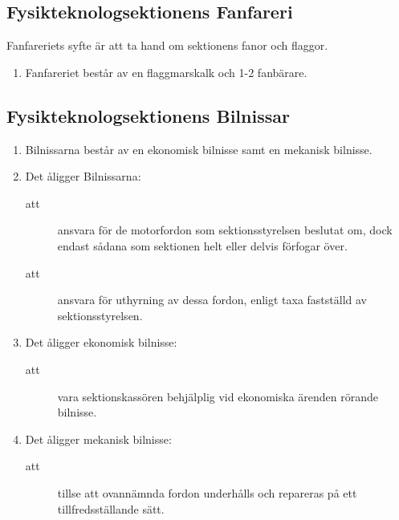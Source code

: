\documentclass[11pt,a4paper]{article}
\begin{document}
\subsection{Fysikteknologsektionens Fanfareri}
Fanfareriets syfte är att ta hand om sektionens fanor och flaggor.
\begin{enumerate}[\thesubsection .1]

  \item Fanfareriet består av en flaggmarskalk och 1-2 fanbärare.


\end{enumerate}

\subsection{Fysikteknologsektionens Bilnissar}

\begin{enumerate}[\thesubsection .1]

  \item Bilnissarna består av en ekonomisk bilnisse samt en mekanisk
  bilnisse.

  \item Det åligger Bilnissarna:
    \begin{description}
      \item[att] ansvara för de motorfordon som sektionsstyrelsen
      beslutat om, dock endast sådana som sektionen helt eller delvis
      förfogar över.
      \item[att] ansvara för uthyrning av dessa fordon, enligt taxa
      fastställd av sektionsstyrelsen.
    \end{description}

  \item Det åligger ekonomisk bilnisse:
    \begin{description}
      \item[att] vara sektionskassören behjälplig vid ekonomiska
      ärenden rör\-an\-de bilnisse.
    \end{description}

  \item Det åligger mekanisk bilnisse:
    \begin{description}
      \item[att] tillse att ovannämnda fordon underhålls och repareras
      på ett tillfredsställande sätt.
    \end{description}

\end{enumerate}
\end{document}
